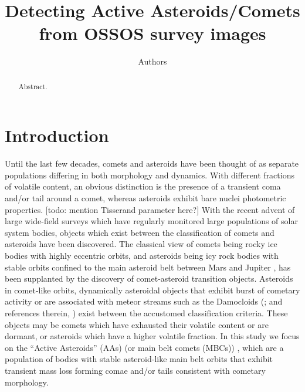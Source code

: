 \documentclass[iop,apj]{emulateapj}
\begin{document}
\title{Detecting Active Asteroids/Comets from OSSOS survey images}
\author{Authors}

\begin{abstract}
Abstract.
\end{abstract}

\maketitle

\section{Introduction}

Until the last few decades, comets and asteroids have been thought of as separate populations differing in  both morphology and dynamics. With different fractions of volatile content, an obvious distinction is the presence of a transient coma and/or tail around a comet, whereas asteroids exhibit bare nuclei photometric properties. [todo: mention Tisserand parameter here?]  With the recent advent of large wide-field surveys which have regularly monitored large populations of solar system bodies, objects which exist between the classification of comets and asteroids have been discovered. The classical view of comets being rocky ice bodies with highly eccentric orbits, and asteroids being icy rock bodies with stable orbits confined to the main asteroid belt between Mars and Jupiter \citep{sheppard15}, has been supplanted by the discovery of comet-asteroid transition objects. Asteroids in comet-like orbits, dynamically asteroidal objects that exhibit burst of cometary activity or are associated with meteor streams such as the Damocloids (\cite{sonnett11}; and references therein, \cite{gilbert09}) exist between the accustomed classification criteria. These objects may be comets which have exhausted their volatile content or are dormant, or asteroids which have a higher volatile fraction. In this study we focus on the ``Active Asteroids'' (AAs) (or main belt comets (MBCs)) \citep{hsieh06}, which are a population of bodies with stable asteroid-like main belt orbits that exhibit transient mass loss forming comae and/or tails consistent with cometary morphology.  
\end{document}
